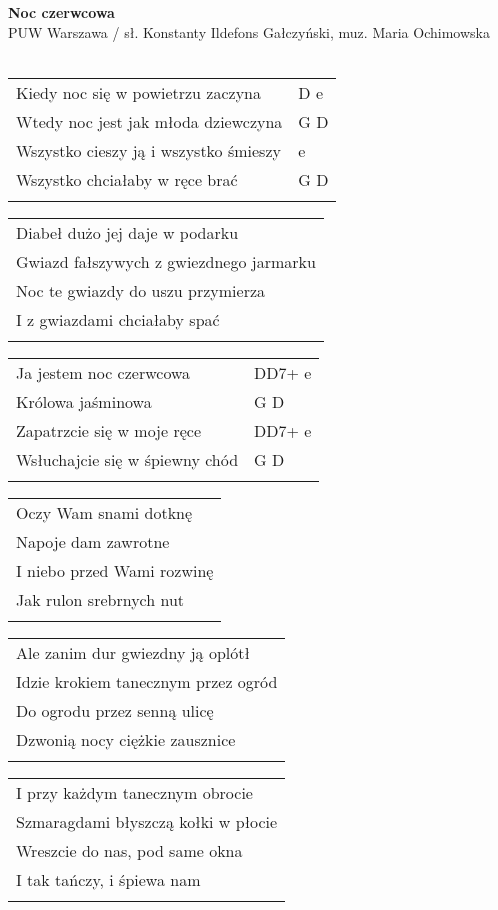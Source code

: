 \documentclass[a5paper]{article}
\begin{document}


\noindent
\fontsize{12pt}{15pt}\selectfont
\textbf{Noc czerwcowa} \\
\fontsize{8pt}{10pt}\selectfont
PUW Warszawa / sł. Konstanty Ildefons Gałczyński, muz. Maria Ochimowska \\ \\
\fontsize{10pt}{12pt}\selectfont
{}
\begin{tabular}{@{}p{7.50cm}p{3cm}@{}}
\noindent
Kiedy noc się w powietrzu zaczyna & D e \\
Wtedy noc jest jak młoda dziewczyna & G D \\
Wszystko cieszy ją i wszystko śmieszy & e \\
Wszystko chciałaby w ręce brać & G D \\ \\
\end{tabular}

\noindent
\begin{tabular}{@{}p{7.50cm}@{}}
Diabeł dużo jej daje w podarku \\
Gwiazd fałszywych z gwiezdnego jarmarku \\
Noc te gwiazdy do uszu przymierza \\
I z gwiazdami chciałaby spać \\ \\
\end{tabular}

\noindent
\begin{tabular}{@{}p{6.50cm}p{3cm}@{}}
Ja jestem noc czerwcowa & DD7+ e \\
Królowa jaśminowa & G D \\
Zapatrzcie się w moje ręce & DD7+ e \\
Wsłuchajcie się w śpiewny chód & G D \\ \\
\end{tabular}

\noindent
\begin{tabular}{@{}p{7.50cm}@{}}
Oczy Wam snami dotknę \\
Napoje dam zawrotne \\
I niebo przed Wami rozwinę \\
Jak rulon srebrnych nut \\ \\
\end{tabular}

\noindent
\begin{tabular}{@{}p{7.50cm}@{}}
Ale zanim dur gwiezdny ją oplótł \\
Idzie krokiem tanecznym przez ogród \\
Do ogrodu przez senną ulicę \\
Dzwonią nocy ciężkie zausznice \\ \\
\end{tabular}

\noindent
\begin{tabular}{@{}p{7.50cm}@{}}
I przy każdym tanecznym obrocie \\
Szmaragdami błyszczą kołki w płocie \\
Wreszcie do nas, pod same okna \\
I tak tańczy, i śpiewa nam \\ \\
\end{tabular}
\end{document}
